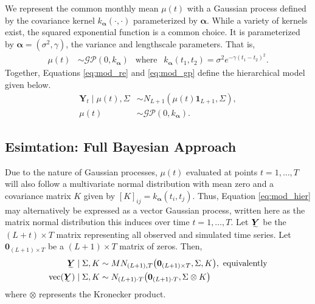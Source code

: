 \documentclass{CUP-JNL-EDS}
\begin{document}
We represent the common monthly mean $\mu(t)$ with a Gaussian process defined by the covariance kernel $k_{\bm{\alpha}}(\cdot, \cdot)$ parameterized by $\bm{\alpha}$. While a variety of kernels exist, the squared exponential function is a common choice. It is parameterized by $\bm{\alpha} = (\sigma^2, \gamma)$, the variance and lengthscale parameters. That is, 
\begin{align}\label{eq:mod_gp}
    \mu(t) &\sim \mathcal{GP}(0, k_{\bm{\alpha}}) \ \ \text{ where } \ \ 
    k_{\bm{\alpha}}(t_1, t_2) = \sigma^2 e^{- \gamma (t_1 - t_2)^2}.
\end{align}
Together, Equations  \ref{eq:mod_re} and \ref{eq:mod_gp} define the hierarchical model given below. 
\begin{equation}\label{eq:mod_hier}
    \begin{split}
        \bm{Y}_{t} \mid \mu(t), \Sigma &\sim N_{L+1} \left(\mu(t)\bm{1}_{L+1}, \Sigma \right),  \\
        \mu(t) & \sim \mathcal{GP}(0, k_{\bm{\alpha}}).
    \end{split}
\end{equation}


\subsection{Esimtation: Full Bayesian Approach}\label{ss:implementation}

Due to the nature of Gaussian processes, $\mu(t)$ evaluated at points $t=1,\dots,T$ will also follow a multivariate normal distribution with mean zero and a covariance matrix $K$ given by $[K]_{ij} = k_{\bm{\alpha}}(t_i, t_j)$. Thus, Equation \ref{eq:mod_hier} may alternatively be expressed as a vector Gaussian process, written here as the matrix normal distribution this induces over time $t=1,\dots,T$. Let $\undertilde{\bm{Y}}$ be the $(L+t) \times T$ matrix representing all observed and simulated time series. Let $\bm{0}_{(L+1)\times T}$ be a $(L+1)\times T$ matrix of zeros. Then,
\begin{equation}\label{eq:mod_matnorm}
\begin{split}
    \undertilde{\bm{Y}} \mid \Sigma, K &\sim MN_{(L+1), T}\big(\bm{0}_{(L+1)\times T}, \Sigma, K \big), \text{ equivalently} \\
    \operatorname{vec}(\undertilde{\bm{Y}}) \mid \Sigma, K &\sim N_{(L+1)\cdot T}\big(\bm{0}_{(L+1)\cdot T}, \Sigma \otimes K \big)
\end{split}
\end{equation}
where $\otimes$ represents the Kronecker product. 
\end{document}
